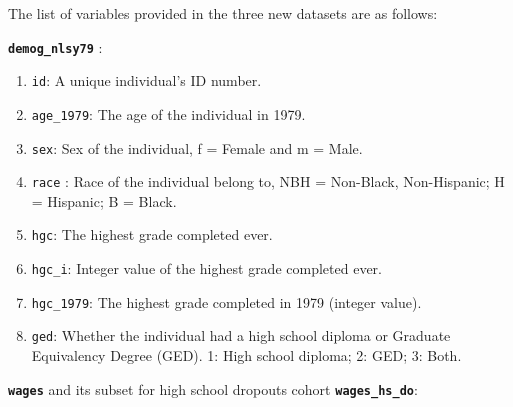\documentclass{article}
\providecommand{\tightlist}{%
  \setlength{\itemsep}{0pt}\setlength{\parskip}{0pt}}
\begin{document}
The list of variables provided in the three new datasets are as follows:

\textbf{\texttt{demog\_nlsy79}} :

\begin{enumerate}
\def\labelenumi{\arabic{enumi}.}
\tightlist
\item
  \texttt{id}: A unique individual's ID number.
\item
  \texttt{age\_1979}: The age of the individual in 1979.
\item
  \texttt{sex}: Sex of the individual, f = Female and m = Male.
\item
  \texttt{race} : Race of the individual belong to, NBH = Non-Black, Non-Hispanic; H = Hispanic; B = Black.
\item
  \texttt{hgc}: The highest grade completed ever.
\item
  \texttt{hgc\_i}: Integer value of the highest grade completed ever.
\item
  \texttt{hgc\_1979}: The highest grade completed in 1979 (integer value).
\item
  \texttt{ged}: Whether the individual had a high school diploma or Graduate Equivalency Degree (GED). 1: High school diploma; 2: GED; 3: Both.
\end{enumerate}

\textbf{\texttt{wages}} and its subset for high school dropouts cohort \textbf{\texttt{wages\_hs\_do}}:
\end{document}
